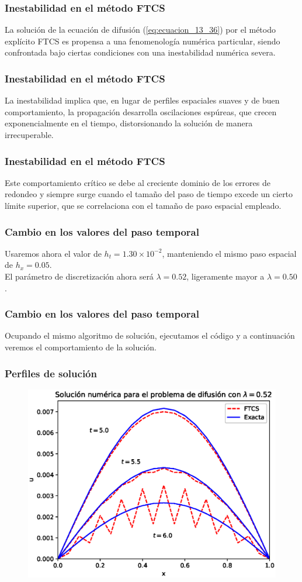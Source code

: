 \begin{frame}
\frametitle{Inestabilidad en el método FTCS}
La solución de la ecuación de difusión (\ref{eq:ecuacion_13_36}) por el método explícito FTCS es propensa a una fenomenología numérica particular, siendo confrontada bajo ciertas condiciones con una inestabilidad numérica severa.
\end{frame}
\begin{frame}
\frametitle{Inestabilidad en el método FTCS}
La inestabilidad implica que, en lugar de perfiles espaciales suaves y de buen comportamiento, la propagación desarrolla oscilaciones espúreas, que crecen exponencialmente en el tiempo, distorsionando la solución de manera irrecuperable.
\end{frame}
\begin{frame}
\frametitle{Inestabilidad en el método FTCS}
Este comportamiento crítico se debe al creciente dominio de los errores de redondeo y siempre surge cuando el tamaño del paso de tiempo excede un cierto límite superior, que se correlaciona con el tamaño de paso espacial empleado.
\end{frame}	
\begin{frame}
\frametitle{Cambio en los valores del paso temporal}
Usaremos ahora el valor de $h_{t}=1.30 \times 10^{-2}$, manteniendo el mismo paso espacial de $h_{x}=0.05$.
\\
\bigskip
\pause
El parámetro de discretización ahora será $\lambda=0.52$, ligeramente mayor a $\lambda=0.50$.
\end{frame}
\begin{frame}
\frametitle{Cambio en los valores del paso temporal}
Ocupando el mismo algoritmo de solución, ejecutamos el código y a continuación veremos el comportamiento de la solución.
\end{frame}
{
\begin{frame}
\frametitle{Perfiles de solución}
\begin{figure}
	\centering
	\includegraphics[scale=0.6]{Imagenes/solucionFTSC_03.eps}
\end{figure}
\end{frame}
}
